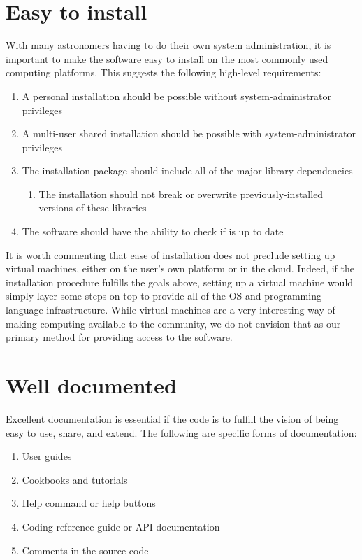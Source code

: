 \documentclass[letterpaper,10pt,english]{sphinxmanual}
\begin{document}
\section{Easy to install}
\label{intro:easy-to-install}
With many astronomers having to do their own system administration, it
is important to make the software easy to install on the most commonly
used computing platforms.  This suggests the following high-level requirements:
\begin{enumerate}
\item {} 
A personal installation should be possible without system-administrator privileges

\item {} 
A multi-user shared installation should be possible with system-administrator privileges

\item {} 
The installation package should include all of the major library dependencies
\begin{enumerate}
\item {} 
The installation should not break or overwrite previously-installed versions of these libraries

\end{enumerate}

\item {} 
The software should have the ability to check if is up to date

\end{enumerate}

It is worth commenting that ease of installation does not preclude setting up
virtual machines, either on the user's own platform or in the cloud. Indeed,
if the installation procedure fulfills the goals above, setting up a virtual
machine would simply layer some steps on top to provide all of the OS and
programming-language infrastructure. While virtual machines are a very interesting
way of making computing available to the community, we do not envision that as
our primary method for providing access to the software.


\section{Well documented}
\label{intro:well-documented}
Excellent documentation is essential if the code is to fulfill the vision of being
easy to use, share, and extend.  The following are specific forms of documentation:
\begin{enumerate}
\item {} 
User guides

\item {} 
Cookbooks and tutorials

\item {} 
Help command or help buttons

\item {} 
Coding reference guide or API documentation

\item {} 
Comments in the source code

\end{enumerate}
\end{document}
